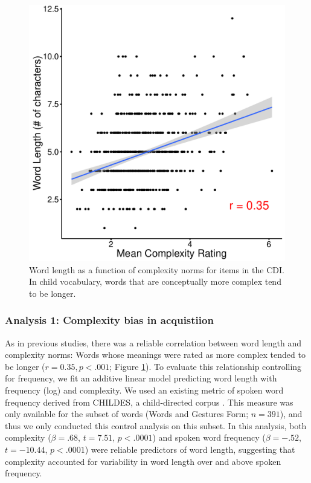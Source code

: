 \begin{figure}[t!]
\begin{center}
\includegraphics[scale = .5]{figs/chap4_3.pdf}
\end{center}
\caption{Word length as a function of complexity norms for items in the CDI. In child vocabulary, words that are conceptually more complex tend to be longer.}
\label{fig:study3}
\end{figure}

\subsubsection{Analysis 1: Complexity bias in acquistiion}
As in previous studies, there was a reliable correlation between word length and complexity norms: Words whose meanings were rated as more complex tended to be longer ($r=0.35, p<.001$; Figure \ref{fig:study3}). To evaluate this relationship controlling for frequency, we fit an additive linear model predicting word length with frequency (log) and complexity. We used an existing metric of spoken word frequency derived from CHILDES, a child-directed corpus \cite{braginsky2016from}. This measure was only available for the subset of words (Words and Gestures Form; $n = 391$), and thus we only conducted this control analysis on this subset. In this analysis, both complexity ($\beta=.68$, $t=7.51$, $p <.0001$) and spoken word frequency ($\beta=-.52$, $t=-10.44$, $p <.0001$) were reliable predictors of word length, suggesting that complexity accounted for variability in word length over and above spoken frequency.

